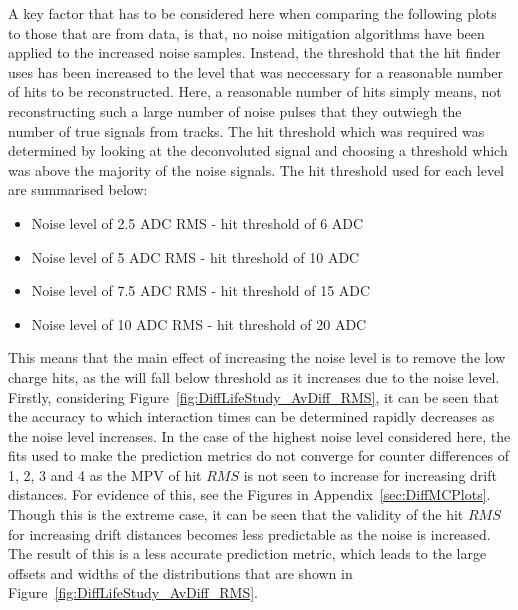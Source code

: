 A key factor that has to be considered here when comparing the following plots to those that are from data, is that, no noise mitigation algorithms have been applied to the increased noise samples. Instead, the threshold that the hit finder uses has been increased to the level that was neccessary for a reasonable number of hits to be reconstructed. Here, a reasonable number of hits simply means, not reconstructing such a large number of noise pulses that they outwiegh the number of true signals from tracks. The hit threshold which was required was determined by looking at the deconvoluted signal and choosing a threshold which was above the majority of the noise signals. The hit threshold used for each level are summarised below:
\begin{itemize}
\item Noise level of 2.5 ADC RMS - hit threshold of 6 ADC
\item Noise level of 5 ADC RMS - hit threshold of 10 ADC
\item Noise level of 7.5 ADC RMS - hit threshold of 15 ADC
\item Noise level of 10 ADC RMS - hit threshold of 20 ADC
\end{itemize}
This means that the main effect of increasing the noise level is to remove the low charge hits, as the will fall below threshold as it increases due to the noise level. \\

Firstly, considering Figure~\ref{fig:DiffLifeStudy_AvDiff_RMS}, it can be seen that the accuracy to which interaction times can be determined rapidly decreases as the noise level increases. In the case of the highest noise level considered here, the fits used to make the prediction metrics do not converge for counter differences of 1, 2, 3 and 4 as the MPV of hit $RMS$ is not seen to increase for increasing drift distances. For evidence of this, see the Figures in Appendix~\ref{sec:DiffMCPlots}. Though this is the extreme case, it can be seen that the validity of the hit $RMS$ for increasing drift distances becomes less predictable as the noise is increased. The result of this is a less accurate prediction metric, which leads to the large offsets and widths of the distributions that are shown in Figure~\ref{fig:DiffLifeStudy_AvDiff_RMS}.\\

